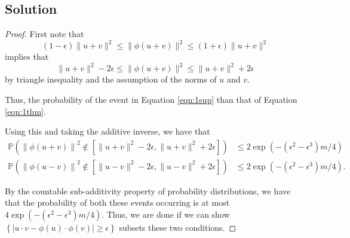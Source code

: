 \subsection*{Solution}
\begin{proof}
  First note that
  \begin{equation*}
      (1 - \epsilon) \lVert u + v \rVert^2
      \leq
      \lVert \phi\left(u + v\right) \rVert^2
      \leq
      \left(1 + \epsilon\right) \lVert u + v \rVert^2
    \end{equation*}
    implies that
    \begin{equation}
      \lVert u + v \rVert^2 - 2\epsilon
      \leq
      \lVert \phi\left(u + v\right) \rVert^2
      \leq
      \lVert u + v \rVert^2 + 2\epsilon
      \label{eqn:1sup}
    \end{equation}
    by triangle inequality and the assumption of the norms of $u$ and $v$.

    Thus, the probability of the event in Equation \ref{eqn:1sup} than that of
    Equation \ref{eqn:1thm}.
      
    Using this and taking the additive inverse, we have that
  \begin{align}
    \mathbb{P}\left(
    \left\lVert \phi(u + v) \right\rVert^2
    \not\in
    \left[
    \lVert u + v \rVert^2 - 2\epsilon,
    \lVert u + v \rVert^2 + 2\epsilon
    \right]
    \right)
    &\leq 2\exp\left(-\left(\epsilon^2 - \epsilon^3\right)m/4\right)
      \label{eqn:1conda}\\
    \mathbb{P}\left(
    \left\lVert \phi(u - v) \right\rVert^2
    \not\in
    \left[
    \lVert u - v \rVert^2 - 2\epsilon,
    \lVert u - v \rVert^2 + 2\epsilon
    \right]
    \right)
    &\leq 2\exp\left(-\left(\epsilon^2 - \epsilon^3\right)m/4\right).
      \label{eqn:1condb}
  \end{align}

  By the countable sub-additivity property of probability distributions, we have
  that the probability of both these events occurring is at most
  $4\exp\left(-\left(\epsilon^2 - \epsilon^3\right)m/4\right)$. Thus, we are
  done if we can show
  $\left\{\left\lvert u \cdot v - \phi(u) \cdot \phi(v) \right\rvert \geq
    \epsilon\right\}$ subsets these two conditions.


\end{proof}
